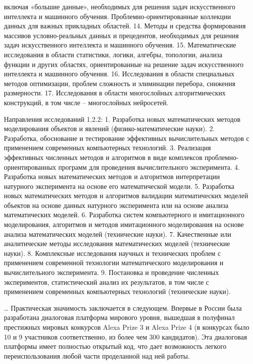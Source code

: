 включая «большие данные», необходимых для решения задач искусственного
интеллекта и машинного обучения. Проблемно-ориентированные коллекции
данных для важных прикладных областей.
14. Методы и средства формирования массивов условно-реальных данных и
прецедентов, необходимых для решения задач искусственного интеллекта и
машинного обучения.
15. Математические исследования в области статистики, логики, алгебры,
топологии, анализа функции и других областях, ориентированные на решение
задач искусственного интеллекта и машинного обучения.
16. Исследования в области специальных методов оптимизации, проблем
сложность и элиминации перебора, снижения размерности.
17. Исследования в области многослойных алгоритмических конструкций, в
том числе – многослойных нейросетей.

Направления исследований 1.2.2:
1. Разработка новых математических методов моделирования объектов и
явлений (физико-математические науки).
2. Разработка, обоснование и тестирование эффективных вычислительных
методов с применением современных компьютерных технологий.
3. Реализация эффективных численных методов и алгоритмов в виде
комплексов проблемно-ориентированных программ для проведения
вычислительного эксперимента.
4. Разработка новых математических методов и алгоритмов интерпретации
натурного эксперимента на основе его математической модели.
5. Разработка новых математических методов и алгоритмов валидации
математических моделей объектов на основе данных натурного эксперимента
или на основе анализа математических моделей.
6. Разработка систем компьютерного и имитационного моделирования,
алгоритмов и методов имитационного моделирования на основе анализа
математических моделей (технические науки).
7. Качественные или аналитические методы исследования математических
моделей (технические науки).
8. Комплексные исследования научных и технических проблем с
применением современной технологии математического моделирования и
вычислительного эксперимента.
9. Постановка и проведение численных экспериментов, статистический
анализ их результатов, в том числе с применением современных
компьютерных технологий (технические науки).
\fi


{\influence} \ldots
Практическая значимость заключается в следующем. Впервые в России была разработана диалоговая платформа мирового уровня, вышедшая в полуфинал престижных мировых конкурсов Alexa Prize 3 и Alexa Prize 4 (в конкурсах было 10 и 9 участников соответственно, из более чем 300 кандидатов). Эта диалоговая платформы имеет полностью открытый код, что дает возможность легкого переиспользования любой части проделанной над ней работы. 

